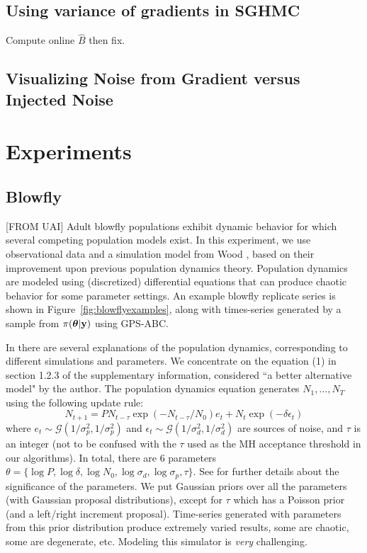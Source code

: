 \documentclass[]{article}
\begin{document}
\subsection{Using variance of gradients in SGHMC}
Compute online $\hat{B}$ then fix.

\subsection{Visualizing Noise from Gradient versus Injected Noise}

\section{Experiments}\label{sec:experiments}

\subsection{Blowfly}\label{sec:bf}
[FROM UAI] Adult blowfly populations exhibit dynamic behavior for which several competing population models exist.  In this experiment, we use observational data and a simulation model from Wood \cite{wood2010statistical}, based on their improvement upon previous population dynamics theory.  Population dynamics are modeled using (discretized) differential equations that can produce chaotic behavior for some parameter settings.  An example blowfly replicate series is shown in Figure~\ref{fig:blowflyexamples}, along with  times-series generated by a sample from $\pi({\bm \theta}|{\bf y})$ using GPS-ABC.
 

In \cite{wood2010statistical} there are several explanations of the population dynamics, corresponding to different simulations and parameters.  We concentrate on the equation (1) in section 1.2.3 of the supplementary information, considered ``a better alternative model" by the author.  The population dynamics equation generates  $N_1, \ldots, N_T$ using the following update rule:
\begin{equation}
N_{t+1} = P N_{t-\tau} \exp(-N_{t-\tau}/N_0) e_t + N_t \exp(-\delta \epsilon_t) \nonumber
\end{equation}
where $e_t \sim  \mathcal{G}( 1/{\sigma_p^2},1/{\sigma_p^2})$ and $\epsilon_t 
 \sim  \mathcal{G}( 1/{\sigma_d^2},1/{\sigma_d^2})$  
are sources of noise, and $\tau$ is an integer (not to be confused with the $\tau$ used as the MH acceptance threshold in our algorithms).  In total, there are 6 parameters $\theta = \{ \log P, \log \delta, \log N_0, \log \sigma_d, \log \sigma_p, \tau\}$.  See \cite{wood2010statistical} for further details about the significance of the parameters.  We put Gaussian priors over all the parameters (with Gaussian proposal distributions), except for $\tau$ which has a Poisson prior (and a left/right increment proposal). Time-series generated with parameters from this prior distribution produce extremely varied results, some are chaotic, some are degenerate, etc.  Modeling this simulator is {\em very} challenging.
\end{document}
